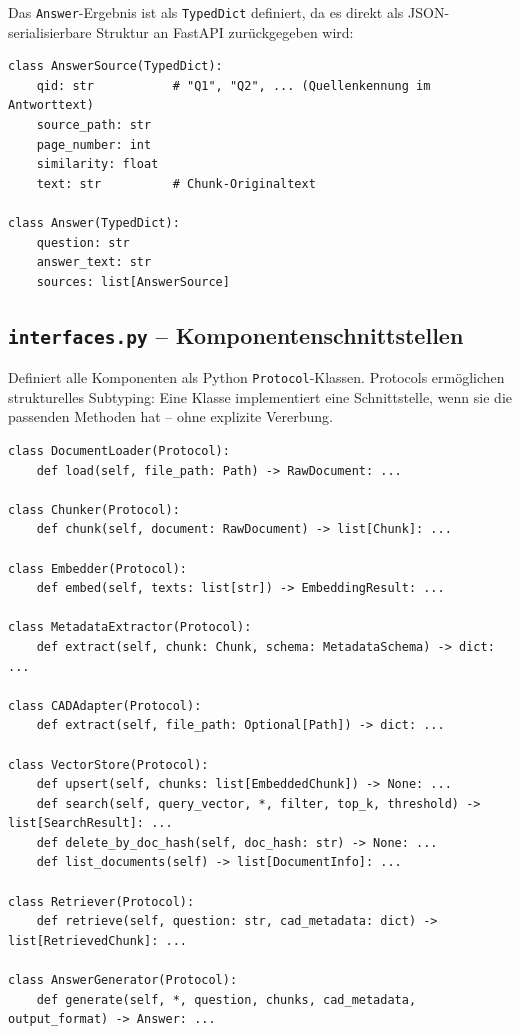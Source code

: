 \documentclass[12pt, a4paper]{article}
\begin{document}
Das \texttt{Answer}-Ergebnis ist als \texttt{TypedDict} definiert, da es direkt
als JSON-serialisierbare Struktur an FastAPI zurückgegeben wird:

\begin{lstlisting}[style=pythonstyle, caption={Antwortformat (types.py)}]
class AnswerSource(TypedDict):
    qid: str           # "Q1", "Q2", ... (Quellenkennung im Antworttext)
    source_path: str
    page_number: int
    similarity: float
    text: str          # Chunk-Originaltext

class Answer(TypedDict):
    question: str
    answer_text: str
    sources: list[AnswerSource]
\end{lstlisting}

\subsection{\texttt{interfaces.py} -- Komponentenschnittstellen}

Definiert alle Komponenten als Python \texttt{Protocol}-Klassen. Protocols ermöglichen
strukturelles Subtyping: Eine Klasse implementiert eine Schnittstelle, wenn sie die
passenden Methoden hat -- ohne explizite Vererbung.

\begin{lstlisting}[style=pythonstyle, caption={Protokoll-Schnittstellen (interfaces.py)}]
class DocumentLoader(Protocol):
    def load(self, file_path: Path) -> RawDocument: ...

class Chunker(Protocol):
    def chunk(self, document: RawDocument) -> list[Chunk]: ...

class Embedder(Protocol):
    def embed(self, texts: list[str]) -> EmbeddingResult: ...

class MetadataExtractor(Protocol):
    def extract(self, chunk: Chunk, schema: MetadataSchema) -> dict: ...

class CADAdapter(Protocol):
    def extract(self, file_path: Optional[Path]) -> dict: ...

class VectorStore(Protocol):
    def upsert(self, chunks: list[EmbeddedChunk]) -> None: ...
    def search(self, query_vector, *, filter, top_k, threshold) -> list[SearchResult]: ...
    def delete_by_doc_hash(self, doc_hash: str) -> None: ...
    def list_documents(self) -> list[DocumentInfo]: ...

class Retriever(Protocol):
    def retrieve(self, question: str, cad_metadata: dict) -> list[RetrievedChunk]: ...

class AnswerGenerator(Protocol):
    def generate(self, *, question, chunks, cad_metadata, output_format) -> Answer: ...
\end{lstlisting}
\end{document}
